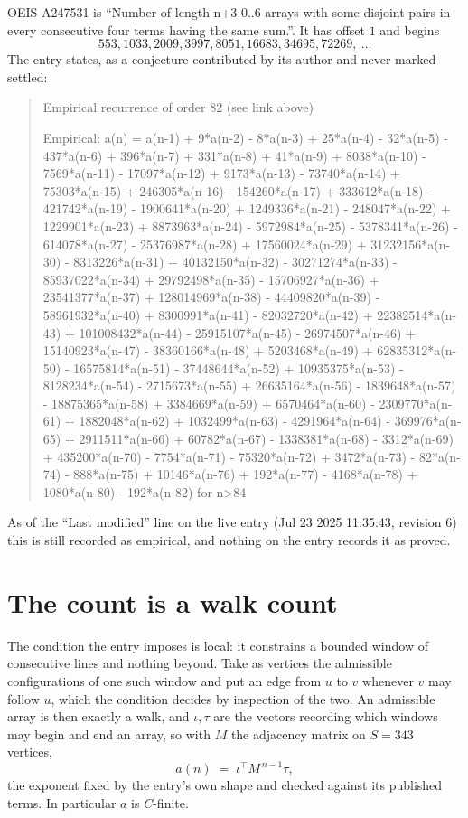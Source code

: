 \documentclass[11pt,a4paper]{article}
\theoremstyle{plain}
\theoremstyle{definition}
\begin{document}
OEIS A247531 is ``Number of length n+3 0..6 arrays with some disjoint pairs in every consecutive four terms having the same sum.''. It has offset $1$ and begins
\[
553, 1033, 2009, 3997, 8051, 16683, 34695, 72269,\ \dots
\]
The entry states, as a conjecture contributed by its author and never marked settled:
\begin{quote}\raggedright\small
Empirical recurrence of order 82 (see link above)

Empirical: a(n) = a(n-1) + 9*a(n-2) - 8*a(n-3) + 25*a(n-4) - 32*a(n-5) - 437*a(n-6) + 396*a(n-7) + 331*a(n-8) + 41*a(n-9) + 8038*a(n-10) - 7569*a(n-11) - 17097*a(n-12) + 9173*a(n-13) - 73740*a(n-14) + 75303*a(n-15) + 246305*a(n-16) - 154260*a(n-17) + 333612*a(n-18) - 421742*a(n-19) - 1900641*a(n-20) + 1249336*a(n-21) - 248047*a(n-22) + 1229901*a(n-23) + 8873963*a(n-24) - 5972984*a(n-25) - 5378341*a(n-26) - 614078*a(n-27) - 25376987*a(n-28) + 17560024*a(n-29) + 31232156*a(n-30) - 8313226*a(n-31) + 40132150*a(n-32) - 30271274*a(n-33) - 85937022*a(n-34) + 29792498*a(n-35) - 15706927*a(n-36) + 23541377*a(n-37) + 128014969*a(n-38) - 44409820*a(n-39) - 58961932*a(n-40) + 8300991*a(n-41) - 82032720*a(n-42) + 22382514*a(n-43) + 101008432*a(n-44) - 25915107*a(n-45) - 26974507*a(n-46) + 15140923*a(n-47) - 38360166*a(n-48) + 5203468*a(n-49) + 62835312*a(n-50) - 16575814*a(n-51) - 37448644*a(n-52) + 10935375*a(n-53) - 8128234*a(n-54) - 2715673*a(n-55) + 26635164*a(n-56) - 1839648*a(n-57) - 18875365*a(n-58) + 3384669*a(n-59) + 6570464*a(n-60) - 2309770*a(n-61) + 1882048*a(n-62) + 1032499*a(n-63) - 4291964*a(n-64) - 369976*a(n-65) + 2911511*a(n-66) + 60782*a(n-67) - 1338381*a(n-68) - 3312*a(n-69) + 435200*a(n-70) - 7754*a(n-71) - 75320*a(n-72) + 3472*a(n-73) - 82*a(n-74) - 888*a(n-75) + 10146*a(n-76) + 192*a(n-77) - 4168*a(n-78) + 1080*a(n-80) - 192*a(n-82) for n>84
\end{quote}
As of the ``Last modified'' line on the live entry (Jul 23 2025 11:35:43, revision 6) this is still
recorded as empirical, and nothing on the entry records it as proved.

\section{The count is a walk count}

The condition the entry imposes is local: it constrains a bounded window of consecutive lines and nothing beyond. Take as vertices the admissible configurations of one such window and put an edge from $u$ to $v$ whenever $v$ may follow $u$, which the condition decides by inspection of the two.
An admissible array is then exactly a walk, and $\iota,\tau$ are the vectors recording which windows may begin and end an array, so with $M$ the adjacency matrix on $S=343$ vertices,
\[
a(n)\;=\;\iota^{\!\top}M^{\,n-1}\tau ,
\]
the exponent fixed by the entry's own shape and checked against its published terms. In
particular $a$ is $C$-finite.
\end{document}
